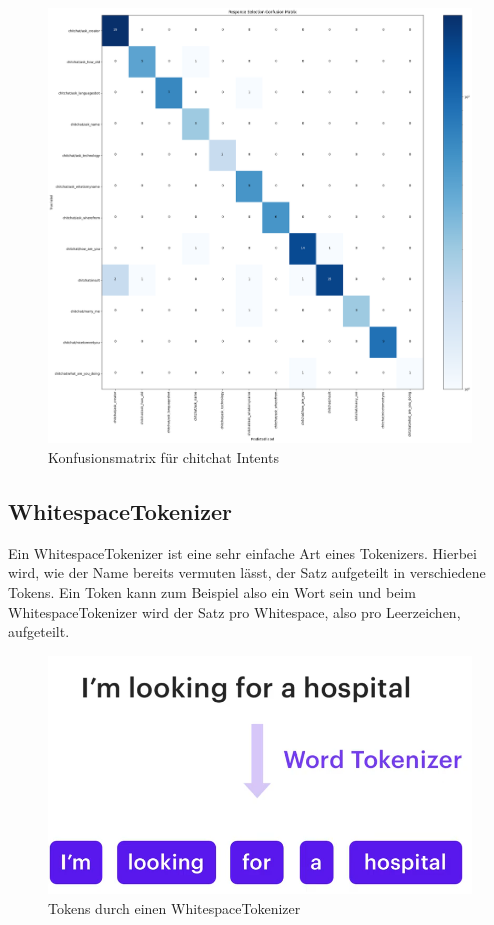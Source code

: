 \begin{figure}[hbt!]
    \centering
    \includegraphics[scale=0.3]{pics/confusion_matrix}
    \caption{Konfusionsmatrix für chitchat Intents}
    \label{fig:confusion_matrix}
\end{figure}

\subsection{WhitespaceTokenizer}\label{subsec:whitespace-tokenizer}

Ein WhitespaceTokenizer ist eine sehr einfache Art eines Tokenizers.
Hierbei wird, wie der Name bereits vermuten lässt, der Satz aufgeteilt in verschiedene Tokens.
Ein Token kann zum Beispiel also ein Wort sein und beim WhitespaceTokenizer wird der Satz pro Whitespace, also pro Leerzeichen, aufgeteilt.\cite{whitespaceTokenizer, rasaMasterclassWhitespaceTokenizer, pipelineComponentsYoutube}

\begin{figure}[hbt!]
    \centering
    \includegraphics[scale=0.25]{pics/whitespacetokenizer}
    \caption{Tokens durch einen WhitespaceTokenizer~\cite{pipelineComponentsYoutube}}
    \label{fig:WhitespaceTokenizer}
\end{figure}

